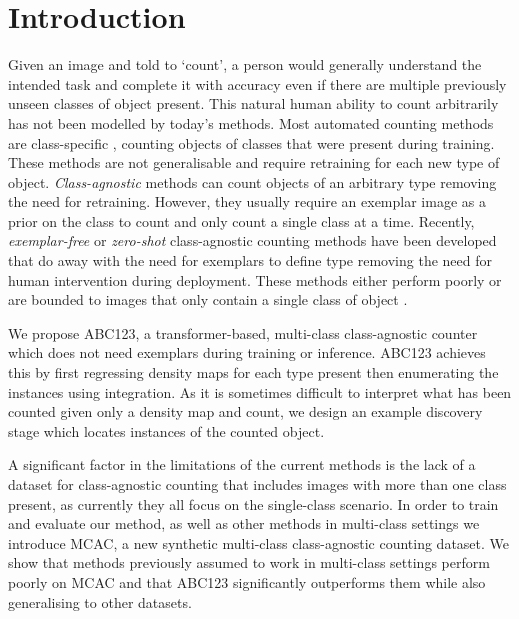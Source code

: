 \documentclass[runningheads]{llncs}
\begin{document}
\section{Introduction}
\label{Introduction}
Given an image and told to `count', a person would generally understand the intended task and complete it with accuracy even if there are multiple previously unseen classes of object present.
This natural human ability to count arbitrarily has not been modelled by today's methods. 
Most automated counting methods are class-specific \cite{cao2018scale, go2021fine}, counting objects of classes that were present during training. 
These methods are not generalisable and require retraining for each new type of object.
\textit{Class-agnostic} methods \cite{ranjan2021Famnet, shi2022represent} can count objects of an arbitrary type removing the need for retraining. 
However, they usually require an exemplar image as a prior on the class to count and only count a single class at a time.
Recently, \textit{exemplar-free} or \textit{zero-shot} class-agnostic counting methods \cite{ranjan2022exemplar, hobley2023LTCA} have been developed that do away with the need for exemplars to define type removing the need for human intervention during deployment. 
These methods either perform poorly \cite{ranjan2022exemplar} or are bounded to images that only contain a single class of object \cite{hobley2023LTCA, Djukic2023LOCA}.

We propose ABC123, a transformer-based, multi-class class-agnostic counter which does not need exemplars during training or inference.
ABC123 achieves this by first regressing density maps for each type present then enumerating the instances using integration.
As it is sometimes difficult to interpret what has been counted given only a density map and count, we design an example discovery stage which locates instances of the counted object.


A significant factor in the limitations of the current methods is the lack of a dataset for class-agnostic counting that includes images with more than one class present, as currently they all focus on the single-class scenario.
In order to train and evaluate our method, as well as other methods in multi-class settings we introduce MCAC, a new synthetic multi-class class-agnostic counting dataset.
We show that methods previously assumed to work in multi-class settings perform poorly on MCAC and that ABC123 significantly outperforms them while also generalising to other datasets. 
\end{document}
